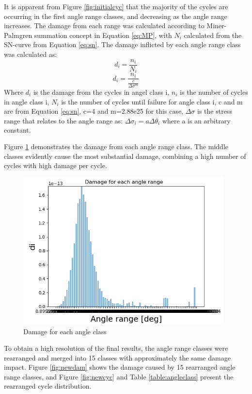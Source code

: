\noindent It is apparent from Figure \ref{fig:initialcyc} that the majority of the cycles are occurring in the first angle range classes, and decreasing as the angle range increases.\newline
\newline
The damage from each range was calculated according to Miner-Palmgren summation concept in Equation \ref{eq:MP}, with $N_i$ calculated from the SN-curve from Equation \ref{eq:sn}. The damage inflicted by each angle range class was calculated as:
\begin{equation}
    d_i  = \frac{n_i}{N_i}
\end{equation}
\begin{equation}
    d_i=\frac{n_i}{\frac{c}{\Delta \sigma ^m}}
\end{equation}
Where $d_i$ is the damage from the cycles in angel class i, $n_i$ is the number of cycles in angle class i, $N_i$ is the number of cycles until failure for angle class i, c and m are from Equation \ref{eq:sn}, c=4 and m=2.88e25 for this case,  $\Delta \sigma$ is the stress range that relates to the angle range as: $\Delta \sigma_i = a \Delta \theta_i$ where a is an arbitrary constant.\newline
\newline 

Figure \ref{fig:initialdam} demonstrates the damage from each angle range class. The middle classes evidently cause the most substantial damage, combining a high number of cycles with high damage per cycle. 
\begin{figure}[H]
\centering
\includegraphics[scale=0.9]{figures/initialdam}
\caption[Damage for each angle class]{Damage for each angle class}
 \label{fig:initialdam}
\end{figure}
To obtain a high resolution of the final results, the angle range classes were rearranged and merged into 15 classes with approximately the same damage impact. Figure \ref{fig:newdam} shows the damage caused by 15 rearranged angle range classes, and Figure \ref{fig:newcyc} and Table \ref{table:angleclass} present the rearranged cycle distribution.  

